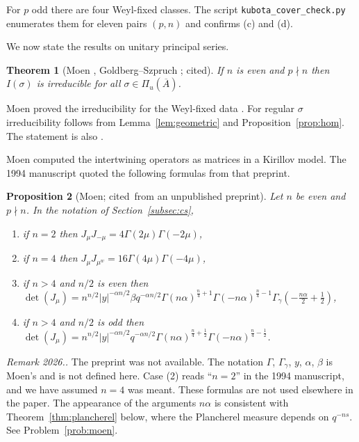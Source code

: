 \documentclass[12pt,letterpaper]{article}
\numberwithin{equation}{section}
\newtheorem{theorem}{Theorem}[section]
\newtheorem{proposition}[theorem]{Proposition}
\theoremstyle{definition}
\newcounter{rmk}
\newcommand{\unverified}[1]{\refstepcounter{rmk}\par\smallskip\noindent\textit{Remark 2026.\arabic{rmk}.} #1\par\smallskip}
\newcommand{\cited}{cited}
\newcommand{\bA}{\overline{A}}
\begin{document}
For $p$ odd there are four Weyl-fixed classes.  The script \texttt{kubota\_cover\_check.py}
enumerates them for eleven pairs $(p,n)$ and confirms (c) and (d).

\medskip
We now state the results on unitary principal series.

\begin{theorem}[Moen \cite{Mo88}, Goldberg--Szpruch \cite{GS16}; \cited]\label{thm:moen-even}
If $n$ is even and $p\nmid n$ then $I(\sigma)$ is irreducible for all
$\sigma\in\Pi_u(\bA)$.
\end{theorem}
Moen proved the irreducibility for the Weyl-fixed data \cite[Theorem~1(b)]{Mo88}.  For
regular $\sigma$ irreducibility follows from Lemma~\ref{lem:geometric} and
Proposition~\ref{prop:hom}.  The statement is also \cite[Theorem~5.2]{GS16}.

Moen \cite{MoND} computed the intertwining operators as matrices in a Kirillov model.  The
1994 manuscript quoted the following formulas from that preprint.

\begin{proposition}[Moen; \cited\ from an unpublished preprint]\label{prop:moen-J}
Let $n$ be even and $p\nmid n$.  In the notation of Section~\ref{subsec:cs},
\begin{enumerate}[label=(\arabic*),leftmargin=*,itemsep=1pt]
\item if $n=2$ then $J_\mu J_{-\mu}=4\Gamma(2\mu)\Gamma(-2\mu)$,
\item if $n=4$ then $J_\mu J_{\mu^w}=16\Gamma(4\mu)\Gamma(-4\mu)$,
\item if $n>4$ and $n/2$ is even then
$\det(J_\mu)=n^{n/2}|y|^{-\alpha n/2}\beta q^{-\alpha n/2}\Gamma(n\alpha)^{\frac n4+1}\Gamma(-n\alpha)^{\frac n4-1}\Gamma_\gamma(-\frac{n\alpha}2+\frac12)$,
\item if $n>4$ and $n/2$ is odd then
$\det(J_\mu)=n^{n/2}|y|^{-\alpha n/2}q^{-\alpha n/2}\Gamma(n\alpha)^{\frac n4+\frac12}\Gamma(-n\alpha)^{\frac n4-\frac12}$.
\end{enumerate}
\end{proposition}
\unverified{The preprint \cite{MoND} was not available.  The notation $\Gamma$,
$\Gamma_\gamma$, $y$, $\alpha$, $\beta$ is Moen's and is not defined here.  Case (2) reads
``$n=2$'' in the 1994 manuscript, and we have assumed $n=4$ was meant.  These formulas are
not used elsewhere in the paper.  The appearance of the arguments $n\alpha$ is consistent
with Theorem~\ref{thm:plancherel} below, where the Plancherel measure depends on
$q^{-ns}$.  See Problem~\ref{prob:moen}.}
\end{document}
